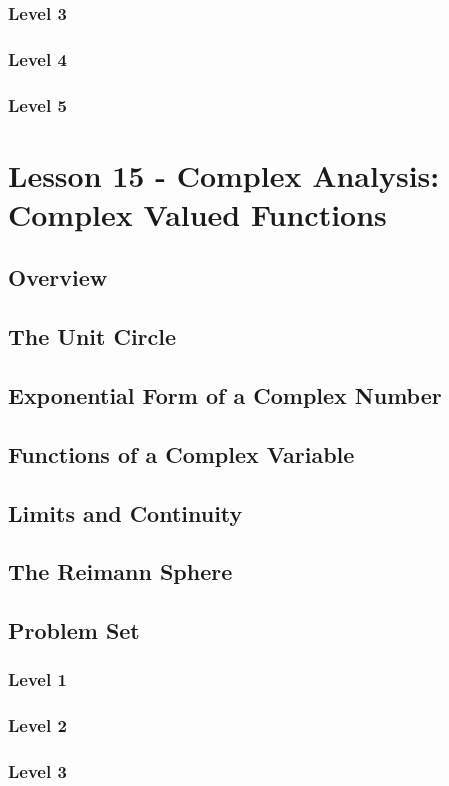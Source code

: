 \documentclass{article}
\begin{document}
\begin{theorem}
\subsubsection{Level 3}
\subsubsection{Level 4}
\subsubsection{Level 5}
\pagebreak

\section{Lesson 15 - Complex Analysis: Complex Valued Functions}
\subsection{Overview}
\subsection{The Unit Circle}
\subsection{Exponential Form of a Complex Number}
\subsection{Functions of a Complex Variable}
\subsection{Limits and Continuity}
\subsection{The Reimann Sphere}
\subsection{Problem Set}
\subsubsection{Level 1}
\subsubsection{Level 2}
\subsubsection{Level 3}

\end{theorem}
\end{document}
